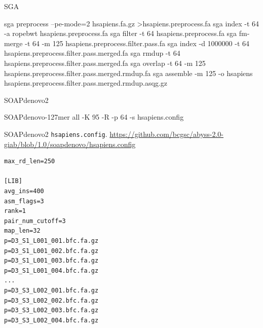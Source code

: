 \documentclass[
  12pt,
  oneside,
  openany]{book}
\newenvironment{Shaded}{}{}
\newcommand{\ExtensionTok}[1]{#1}
\newcommand{\NormalTok}[1]{#1}
\newcommand{\OperatorTok}[1]{\textcolor[rgb]{0.40,0.40,0.40}{#1}}
\begin{document}
\begin{appendices}
\begin{codelisting}
\end{codelisting}

\begin{codelisting}

\caption[SGA]{SGA}

\hypertarget{lst:sga}{%
\label{lst:sga}}%
\begin{Shaded}
\begin{Highlighting}[]
\ExtensionTok{sga}\NormalTok{ preprocess --pe-mode=2 hsapiens.fa.gz }\OperatorTok{>}\NormalTok{hsapiens.preprocess.fa}
\ExtensionTok{sga}\NormalTok{ index -t 64 -a ropebwt hsapiens.preprocess.fa}
\ExtensionTok{sga}\NormalTok{ filter -t 64 hsapiens.preprocess.fa}
\ExtensionTok{sga}\NormalTok{ fm-merge -t 64 -m 125 hsapiens.preprocess.filter.pass.fa}
\ExtensionTok{sga}\NormalTok{ index -d 1000000 -t 64 hsapiens.preprocess.filter.pass.merged.fa}
\ExtensionTok{sga}\NormalTok{ rmdup -t 64 hsapiens.preprocess.filter.pass.merged.fa}
\ExtensionTok{sga}\NormalTok{ overlap -t 64 -m 125 hsapiens.preprocess.filter.pass.merged.rmdup.fa}
\ExtensionTok{sga}\NormalTok{ assemble -m 125 -o hsapiens hsapiens.preprocess.filter.pass.merged.rmdup.asqg.gz}
\end{Highlighting}
\end{Shaded}

\end{codelisting}

\begin{codelisting}

\caption[SOAPdenovo2]{SOAPdenovo2}

\hypertarget{lst:soapdenovo1}{%
\label{lst:soapdenovo1}}%
\begin{Shaded}
\begin{Highlighting}[]
\ExtensionTok{SOAPdenovo-127mer}\NormalTok{ all -K 95 -R -p 64 -s hsapiens.config}
\end{Highlighting}
\end{Shaded}

\end{codelisting}

\begin{codelisting}

\caption[SOAPdenovo2 \texttt{hsapiens.config}.]{SOAPdenovo2 \texttt{hsapiens.config}. \url{https://github.com/bcgsc/abyss-2.0-giab/blob/1.0/soapdenovo/hsapiens.config}}

\hypertarget{lst:soapdenovo2}{%
\label{lst:soapdenovo2}}%
\begin{verbatim}
max_rd_len=250

[LIB]
avg_ins=400
asm_flags=3
rank=1
pair_num_cutoff=3
map_len=32
p=D3_S1_L001_001.bfc.fa.gz
p=D3_S1_L001_002.bfc.fa.gz
p=D3_S1_L001_003.bfc.fa.gz
p=D3_S1_L001_004.bfc.fa.gz
...
p=D3_S3_L002_001.bfc.fa.gz
p=D3_S3_L002_002.bfc.fa.gz
p=D3_S3_L002_003.bfc.fa.gz
p=D3_S3_L002_004.bfc.fa.gz


\end{verbatim}
\end{codelisting}
\end{appendices}
\end{document}
